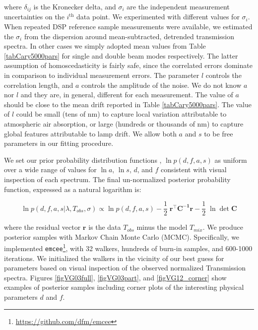 \documentclass[osajnl,preprint,showpacs,superscriptaddress,12pt]{revtex4-1} %
\begin{document}
where $\delta_{ij}$ is the Kronecker delta, and $\sigma_i$ are the independent measurement uncertainties on the $i^{\mathrm{th}}$ data point. We experimented with different values for $\sigma_i$.  When repeated DSP reference sample measurements were available, we estimated the $\sigma_i$ from the dispersion around mean-subtracted, detrended transmission spectra.  In other cases we simply adopted mean values from Table \ref{tabCary5000pars} for single and double beam modes respectively.  The latter assumption of homoscedasticity is fairly safe, since the correlated errors dominate in comparison to individual measurement errors.  The parameter $l$ controls the correlation length, and $a$ controls the amplitude of the noise.  We do not know $a$ nor $l$ and they are, in general, different for each measurement.  The value of $a$ should be close to the mean drift reported in Table \ref{tabCary5000pars}.  The value of $l$ could be small (tens of nm) to capture local variation attributable to atmospheric air absorption, or large (hundreds or thousands of nm) to capture global features attributable to lamp drift.  We allow both $a$ and $s$ to be free parameters in our fitting procedure.

We set our prior probability distribution functions \cite{2013sdmm.book.....I}, $\ln{p(d,f,a,s)}$ as uniform over a wide range of values for $\ln{a}$, $\ln{s}$, $d$, and $f$ consistent with visual inspection of each spectrum.  The final un-normalized posterior probability function, expressed as a natural logarithm is:

\begin{equation}
	\ln{p(d,f,a,s|\lambda, T_{obs}, \sigma)} \propto \ln{p(d,f,a,s)} -\frac{1}{2}\;\boldsymbol{r^\intercal}\boldsymbol{C^{-1}}\boldsymbol{r} -\frac{1}{2}\;\ln{\det{\boldsymbol{C}}} \label{eqnPosterior}
\end{equation}	

where the residual vector $\boldsymbol{r}$ is the data $T_{obs}$ minus the model $T_{mix}$.  We produce posterior samples with Markov Chain Monte Carlo (MCMC).  Specifically, we implemented \texttt{emcee}\footnote{\url{https://github.com/dfm/emcee}}\cite{emcee}, with 32 walkers, hundreds of burn-in samples, and 600-1000 iterations.  We initialized the walkers in the vicinity of our best guess for parameters based on visual inspection of the observed normalized Transmission spectra.  Figures \ref{figVG03full}, \ref{figVG03part}, and \ref{figVG12_corner} show examples of posterior samples including corner plots of the interesting physical parameters $d$ and $f$.
\end{document}
